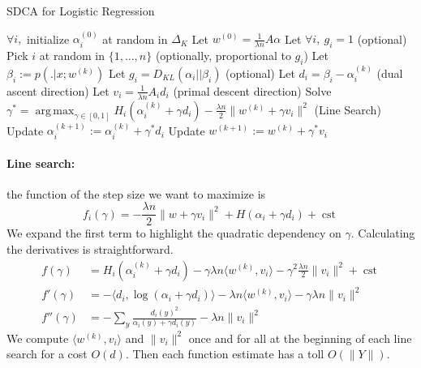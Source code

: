 \documentclass{article}
\DeclareMathOperator{\cst}{cst}
\DeclareMathOperator{\1}{\mathbb{1}}
\DeclareMathOperator*{\argmax}{arg\,max}
\begin{document}
\begin{algorithm}[ht]
    \caption{SDCA for Logistic Regression}%
    \label{sdca for logreg}
\begin{algorithmic}
        \STATE $\forall i,$ initialize $\alpha_i^{(0)}$ at random in $\Delta_K$
        \STATE Let $w^{(0)} = \frac{1}{\lambda n} A \alpha$  
        \STATE Let $\forall i,\  g_i = 1$ (optional)
                \STATE Pick $i$ at random in $\{1,\ldots,n\}$ (optionally, proportional to $g_i$)
                \STATE Let $ \beta_i := p( . |x ; w^{(k)})$
                \STATE Let $g_i = D_{KL}(\alpha_i || \beta_i)$ (optional)
                \STATE Let $d_i = \beta_i - \alpha_i^{(k)}$ (dual ascent direction)
                \STATE Let $v_i = \frac{1}{\lambda n} A_i d_i $ (primal descent direction)
                \STATE Solve $\gamma^* = \argmax_{\gamma \in [0,1]} H_i(\alpha_i^{(k)} + \gamma d_i) - \frac{\lambda n}{2} \| w^{(k)} + \gamma v_i \|^2$ (Line Search)
               \STATE Update $\alpha_i^{(k+1)} := \alpha_i^{(k)} + \gamma^* d_i$
               \STATE Update $w^{(k+1)} := w^{(k)} + \gamma^* v_i $
        \ENDFOR
\end{algorithmic}
\end{algorithm}


\paragraph{Line search:} 
the function of the step size we want to maximize is 
\begin{equation*}
	\label{line search 1}
	f_i(\gamma) = -\frac{\lambda n}{2} \|w + \gamma v_i\|^2 + H(\alpha_i + \gamma d_i) + \cst
\end{equation*}
We expand the first term to highlight the quadratic dependency on $\gamma$.
Calculating the derivatives is straightforward.
\begin{align*}
	f(\gamma)
	& = H_i(\alpha_i^{(k)} + \gamma d_i)
	- \gamma \lambda n  \langle w^{(k)} , v_i \rangle 
	- \gamma^2 \frac{\lambda n}{2} \|v_i \|^2
	+ \cst
	\\
	f'(\gamma) & =  - \langle d_i, \log(\alpha_i + \gamma d_i) \rangle
	- \lambda n \langle w^{(k)} , v_i \rangle 
	- \gamma \lambda n \|v_i \|^2 
	\\
	f''(\gamma) & = - \sum_{y} \frac{d_{i}(y)^2 }{ \alpha_i(y) + \gamma d_i(y) }
	- \lambda n  \|v_i \|^2 
\end{align*}
We compute $\langle w^{(k)} , v_i \rangle$ and $ \|v_i \|^2$ once and for all at the beginning of each line search for a cost $O(d)$. Then each function estimate has a toll $O(\|Y\|)$.
\end{document}
